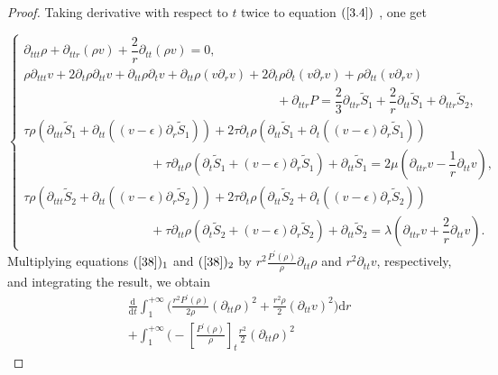 \documentclass[10pt,reqno]{amsart}
\numberwithin{equation}{section}
\begin{document}
	\begin{proof}
		Taking derivative with respect to $t$ twice to equation $(\ref{3.4})$ , one get
		
		\begin{equation} \label{38}
			\begin{cases}
				\partial_{ttt} \rho+\partial_{ttr}(\rho v)+\dfrac{2}{r}\partial_{tt}(\rho v)=0, \\
				\rho\partial_{ttt} v+2\partial_{t}\rho \partial_{tt}v+ \partial_{tt}\rho \partial_{t}v+\partial_{tt}\rho (v \partial_r v)+2\partial_{t}\rho\partial_{t}(v\partial_{r}v)+\rho\partial_{tt}(v\partial_{r}v)\\
				\qquad\qquad\qquad\qquad\qquad\qquad\qquad\qquad\qquad\qquad+\partial_{ttr} P=\dfrac{2}{3}\partial_{ttr}  \tilde{S}_1+\dfrac{2}{r} \partial_{tt}\tilde{S}_1+\partial_{ttr} \tilde{S}_2,\\
				\tau \rho \left(\partial_{ttt} \tilde{S}_1+\partial_{tt} ((v-\epsilon)\partial_r\tilde{S}_1) \right)
				+2\tau \partial_t \rho \left(\partial_{tt} \tilde{S}_1
				+\partial_{t} ((v-\epsilon)\partial_r\tilde{S}_1) \right) \\
				\qquad\qquad\qquad\qquad\qquad+\tau \partial_{tt} \rho \left(\partial_t \tilde{S}_1+(v-\epsilon)\partial_r\tilde{S}_1 \right) +\partial_{tt} \tilde{S}_1=2\mu\left(\partial_{ttr} v- \dfrac{1}{r}\partial_{tt} v \right), \\
				\tau  \rho \left(\partial_{ttt} \tilde{S}_2+\partial_{tt} ((v-\epsilon)\partial_r\tilde{S}_2) \right)
				+2\tau  \partial_t \rho \left(\partial_{tt} \tilde{S}_2+\partial_{t} ((v-\epsilon)\partial_r\tilde{S}_2) \right) \\
				\qquad\qquad\qquad\qquad\qquad+\tau  \partial_{tt} \rho \left(\partial_t \tilde{S}_2+(v-\epsilon)\partial_r\tilde{S}_2 \right) +\partial_{tt} \tilde{S}_2=\lambda \left(\partial_{ttr} v+\dfrac{2}{r}\partial_{tt} v\right).
			\end{cases}
		\end{equation}
		Multiplying equations
		$(\ref{38})_1$ and $(\ref{38})_2$ 
		by $r^2\frac{{P}^{\prime}(\rho)}{\rho}\partial_{tt}\rho$ and $r^2\partial_{tt}v$, respectively, and  integrating the result, we obtain
			\begin{align}\label{3.47}
				\nonumber
				&\frac{\mathrm{d}}{\mathrm{d} t}\int_{1}^{+\infty}\bigg(\frac{r^2 P^{\prime}(\rho)}{2\rho} (\partial_{tt}\rho)^2+\frac{r^2\rho}{2}(\partial_{tt}v)^2
				\bigg)\mathrm{d}r\\ \nonumber
				&+\int_{1}^{+\infty}\bigg(-[\frac{ P^{\prime}(\rho)}{\rho}]_t\frac{r^2}{2}(\partial_{tt}\rho)^2

\end{align}
\end{proof}
\end{document}
